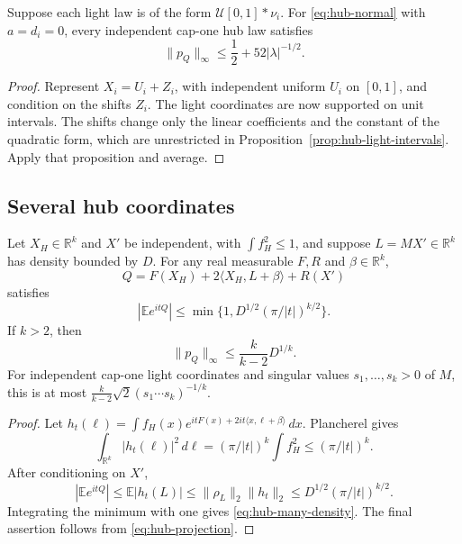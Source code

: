 \begin{corollary}\label{cor:hub-window-lights}
Suppose each light law is of the form $\mathcal U[0,1]*\nu_i$.
For \eqref{eq:hub-normal} with $a=d_i=0$, every independent cap-one
hub law satisfies
\[
 \|p_Q\|_\infty\le\frac12+52|\lambda|^{-1/2}.
\]
\end{corollary}

\begin{proof}
Represent $X_i=U_i+Z_i$, with independent uniform $U_i$ on $[0,1]$,
and condition on the shifts $Z_i$.  The light coordinates are now
supported on unit intervals.  The shifts change only the linear
coefficients and the constant of the quadratic form, which are
unrestricted in Proposition~\ref{prop:hub-light-intervals}.
Apply that proposition and average.
\end{proof}

\subsection{Several hub coordinates}

\begin{theorem}\label{thm:hub-many}
Let $X_H\in\mathbb R^k$ and $X'$ be independent, with
$\int f_H^2\le1$, and suppose $L=MX'\in\mathbb R^k$ has density
bounded by $D$.  For any real measurable $F,R$ and $\beta\in\mathbb R^k$,
\[
 Q=F(X_H)+2\langle X_H,L+\beta\rangle+R(X')
\]
satisfies
\[
 |\mathbb E e^{itQ}|\le
       \min\{1,D^{1/2}(\pi/|t|)^{k/2}\}.
\]
If $k>2$, then
\begin{equation}\label{eq:hub-many-density}
 \|p_Q\|_\infty\le\frac{k}{k-2}D^{1/k}.
\end{equation}
For independent cap-one light coordinates and singular values
$s_1,\ldots,s_k>0$ of $M$, this is at most
$\frac{k}{k-2}\sqrt2(s_1\cdots s_k)^{-1/k}$.
\end{theorem}

\begin{proof}
Let
$h_t(\ell)=\int f_H(x)e^{itF(x)+2it\langle x,\ell+\beta\rangle}\,dx$.
Plancherel gives
\[
 \int_{\mathbb R^k}|h_t(\ell)|^2\,d\ell
   =(\pi/|t|)^k\int f_H^2\le(\pi/|t|)^k.
\]
After conditioning on $X'$,
\[
 |\mathbb E e^{itQ}|\le\mathbb E|h_t(L)|
 \le\|\rho_L\|_2\|h_t\|_2
 \le D^{1/2}(\pi/|t|)^{k/2}.
\]
Integrating the minimum with one gives
\eqref{eq:hub-many-density}.  The final assertion follows from
\eqref{eq:hub-projection}.
\end{proof}

